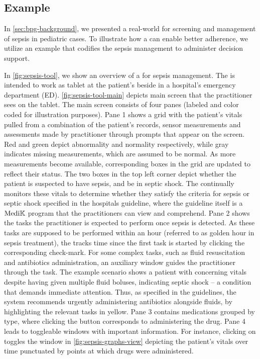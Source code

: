 \subsection{\CDSS{} Example}\label{sec:cdss-example}

In \autoref{sec:bpg-background}, we presented a real-world
\BPG{} for screening and management of sepsis in pediatric cases.
To illustrate how a \CDSSs{} can enable better \BPG{} adherence,
we utilize an example \CDSS{} that codifies the sepsis management \BPG{}
to administer decision support.

In \autoref{fig:sepsis-tool}, we show an overview
of a \CDSS{} for sepsis management.
The \CDSS{} is intended to work as tablet at
the patient's beside in a hospital's emergency department (ED).
\autoref{fig:sepsis-tool-main} depicts main screen that the practitioner sees on the tablet.
The main screen consists of four panes (labeled and color coded for illustration
purposes). Pane 1 shows a grid with the patient's vitals pulled
from a combination of the patient's records, sensor measurements and
assessments made by practitioner through prompts that appear on the screen.
Red and green depict abnormality and normality respectively, while gray
indicates missing measurements, which are assumed to be normal. As more
measurements become available, corresponding boxes in the grid are updated
to reflect their status. The two boxes in the top left corner depict whether
the patient is suspected to have sepsis, and be in septic shock. The \CDSS{}
continually monitors these vitals to determine whether they satisfy the criteria
for sepsis or septic shock specified in the hospitals guideline, where the
guideline itself is a $\text{Medi}\mathbb{K}{}{}$ program that the practitioners can view and
comprehend. Pane 2 shows the tasks the practitioner is expected to perform
once sepsis is detected. As these tasks are supposed to be performed within an
hour (referred to as golden hour in sepsis treatment), the \CDSS{} tracks time
since the first task is started by clicking the corresponding check-mark.
For some complex tasks, such as fluid resuscitation and antibiotics
administration, an auxiliary window guides the practitioner through the task. The
example scenario shows a patient with concerning vitals despite having
given multiple fluid boluses, indicating septic shock -- a condition that
demands immediate attention. Thus, as specified in the guidelines, the system
recommends urgently administering antibiotics alongside fluids, by highlighting
the relevant tasks in yellow.
Pane 3 contains medications grouped by type, where clicking the
 button corresponds to administering the drug.
Pane 4 leads to toggleable windows with
important information. For instance, clicking on 
toggles the window in \autoref{fig:sepsis-graphs-view} depicting
the patient's vitals over time punctuated by points at which
drugs were administered.

